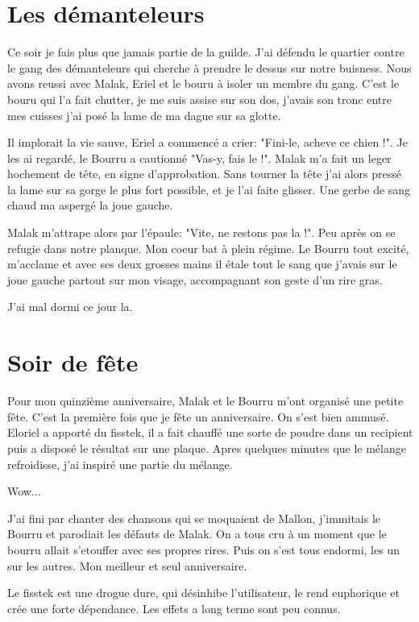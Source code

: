 \documentclass[10pt,a4paper,twoside,twocolumn,openany]{book}
\begin{document}
\section{Les démanteleurs}

Ce soir je fais plus que jamais partie de la guilde. J'ai défendu le quartier contre le gang des
démanteleurs qui cherche à prendre le dessus sur notre buisness.
Nous avons reussi avec Malak, Eriel et le bouru à isoler un membre du gang. C'est le bouru
qui l'a fait chutter, je me suis assise sur son dos, j'avais son tronc entre mes cuisses j'ai posé 
la lame de ma dague sur sa glotte. 

Il implorait la vie sauve, Eriel a commencé a crier: "Fini-le, acheve ce chien !". Je les ai regardé,
le Bourru a cautionné "Vas-y, fais le !". Malak m'a fait un leger hochement de tête, en signe
d'approbation. Sans tourner la tête j'ai alors pressé la lame sur sa gorge le plus fort possible,
et je l'ai faite glisser. Une gerbe de sang chaud ma aspergé la joue gauche.

Malak m'attrape alors par l'épaule: "Vite, ne restons pas la !". Peu après on se refugie dans notre planque.
Mon coeur bat à plein régime. Le Bourru tout excité, m'acclame et avec ses deux grosses mains il étale
tout le sang que j'avais sur le joue gauche partout sur mon visage, accompagnant son geste d'un rire gras. 

J'ai mal dormi ce jour la.

\section{Soir de fête}

Pour mon quinzième anniversaire, Malak et le Bourru m'ont organisé une petite fête. C'est la première fois
que je fête un anniversaire. On s'est bien ammusé. Eloriel a apporté du fisstek, il a fait chauffé une 
sorte de poudre dans un recipient puis a disposé le résultat sur une plaque. Apres quelques minutes
que le mélange refroidisse, j'ai inspiré une partie du mélange.

Wow...

J'ai fini par chanter des chansons qui se moquaient de Mallon, j'immitais le Bourru et parodiait
les défauts de Malak. On a tous cru à un moment que le bourru allait s'etouffer avec ses propres rires.
Puis on s'est tous endormi, les un sur les autres. Mon meilleur et seul anniversaire.

\begin{quotebox}
Le fisstek est une drogue dure, qui désinhibe l'utilisateur, le rend euphorique et crée une forte dépendance.
Les effets a long terme sont peu connus.
\end{quotebox}
\end{document}
